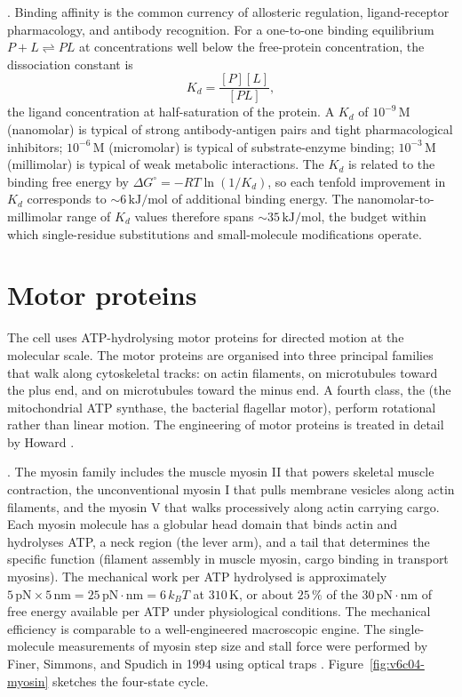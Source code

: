 . Binding affinity is the
common currency of allosteric regulation, ligand-receptor pharmacology,
and antibody recognition. For a one-to-one binding equilibrium
$P + L \rightleftharpoons PL$ at concentrations well below the
free-protein concentration, the dissociation constant is
\[
K_d = \frac{[P][L]}{[PL]},
\]
the ligand concentration at half-saturation of the protein. A
$K_d$ of $10^{-9}\,\text{M}$ (nanomolar) is typical of strong
antibody-antigen pairs and tight pharmacological inhibitors;
$10^{-6}\,\text{M}$ (micromolar) is typical of substrate-enzyme
binding; $10^{-3}\,\text{M}$ (millimolar) is typical of weak
metabolic interactions. The $K_d$ is related to the binding free
energy by $\Delta G^{\circ} = -RT \ln(1/K_d)$, so each tenfold
improvement in $K_d$ corresponds to $\sim 6\,\text{kJ}/\text{mol}$
of additional binding energy. The nanomolar-to-millimolar range of
$K_d$ values therefore spans $\sim 35\,\text{kJ}/\text{mol}$, the
budget within which single-residue substitutions and small-molecule
modifications operate.

\section{Motor proteins}

The cell uses ATP-hydrolysing motor proteins for directed motion at
the molecular scale. The motor proteins are organised into three
principal families that walk along cytoskeletal tracks:
 on actin filaments,  on microtubules
toward the plus end, and  on microtubules toward the
minus end. A fourth class, the  (the
mitochondrial ATP synthase, the bacterial flagellar motor), perform
rotational rather than linear motion. The engineering of motor
proteins is treated in detail by Howard
\cite[ch.~5--10]{text:howard-mechanics-motor-proteins,text:v6c04-howard-motor-2001}.

. The myosin family includes the muscle myosin II
that powers skeletal muscle contraction, the unconventional myosin I
that pulls membrane vesicles along actin filaments, and the myosin V
that walks processively along actin carrying cargo. Each myosin
molecule has a globular head domain that binds actin and hydrolyses
ATP, a neck region (the lever arm), and a tail that determines the
specific function (filament assembly in muscle myosin, cargo binding
in transport myosins). The mechanical work per ATP hydrolysed is
approximately $5\,\text{pN} \times 5\,\text{nm} = 25\,\text{pN} \cdot
\text{nm} = 6\,k_B T$ at $310\,\si{\kelvin}$, or about $25\,\%$ of the
$30\,\text{pN} \cdot \text{nm}$ of free energy available per ATP
under physiological conditions. The mechanical efficiency is
comparable to a well-engineered macroscopic engine. The
single-molecule measurements of myosin step size and stall force
were performed by Finer, Simmons, and Spudich in 1994 using optical
traps \cite{paper:v6c04-finer-simmons-spudich-1994}.
Figure~\ref{fig:v6c04-myosin} sketches the four-state cycle.

